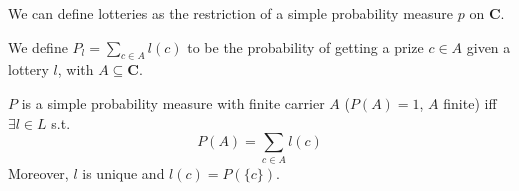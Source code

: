 \documentclass[12pt]{extarticle}
\begin{document}
We can define lotteries as the restriction of a simple probability measure $p$ on $\bm C$.

We define $P_l = \sum_{c \in A} l(c)$ to be the probability of getting a prize $c \in A$ given a lottery $l$, with $A \subseteq \bm C$.

\begin{proposition}{}{}
	$P$ is a simple probability measure with finite carrier $A$ ($P(A)=1$, $A$ finite) iff $\exists l \in L$ s.t.
	\begin{equation}
		P(A) = \sum_{c \in A} l(c)
	\end{equation}
	Moreover, $l$ is unique and $l(c) = P(\{c\})$.
\end{proposition}
\end{document}
